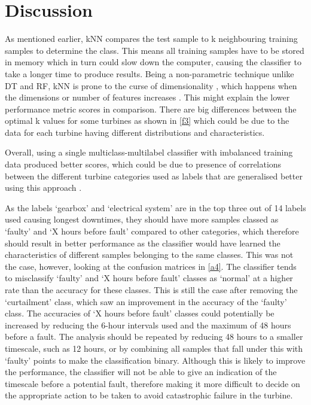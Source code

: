\chapter{Discussion}\label{c4}

As mentioned earlier, kNN compares the test sample to k neighbouring training
samples to determine the class. This means all training samples have to be
stored in memory \cite{Gutie} which in turn could slow down the computer,
causing the classifier to take a longer time to produce results. Being a
non-parametric technique \cite{16N} unlike DT and RF, kNN is prone to the
curse of dimensionality \cite{Gutie}, which happens when the dimensions or
number of features increases \cite{Distr}. This might explain the lower
performance metric scores in comparison. There are big differences between the
optimal k values for some turbines as shown in \autoref{f3} which could be due
to the data for each turbine having different distributions and
characteristics.

Overall, using a single multiclass-multilabel classifier with imbalanced
training data produced better scores, which could be due to presence of
correlations between the different turbine categories used as labels that are
generalised better using this approach \cite{110}.

As the labels `gearbox' and `electrical system' are in the top three out of 14
labels used causing longest downtimes, they should have more samples classed
as `faulty' and `X hours before fault' compared to other categories, which
therefore should result in better performance as the classifier would have
learned the characteristics of different samples belonging to the same
classes. This was not the case, however, looking at the confusion matrices in
\autoref{a4}. The classifier tends to misclassify `faulty' and `X hours before
fault' classes as `normal' at a higher rate than the accuracy for these
classes. This is still the case after removing the `curtailment' class, which
saw an improvement in the accuracy of the `faulty' class. The accuracies of
`X hours before fault' classes could potentially be increased by reducing the
6-hour intervals used and the maximum of 48 hours before a fault. The analysis
should be repeated by reducing 48 hours to a smaller timescale, such as 12
hours, or by combining all samples that fall under this with `faulty' points
to make the classification binary. Although this is likely to improve the
performance, the classifier will not be able to give an indication of the
timescale before a potential fault, therefore making it more difficult to
decide on the appropriate action to be taken to avoid catastrophic failure in
the turbine.

